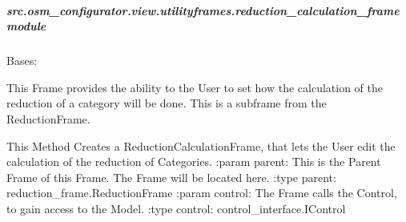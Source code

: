 \documentclass[letterpaper,10pt,english]{sphinxmanual}
\begin{document}
\subparagraph{src.osm\_configurator.view.utilityframes.reduction\_calculation\_frame module}
\label{\detokenize{apidoc/src.osm_configurator.view.utilityframes:module-src.osm_configurator.view.utilityframes.reduction_calculation_frame}}\label{\detokenize{apidoc/src.osm_configurator.view.utilityframes:src-osm-configurator-view-utilityframes-reduction-calculation-frame-module}}

\begin{fulllineitems}
\label{\detokenize{apidoc/src.osm_configurator.view.utilityframes:src.osm_configurator.view.utilityframes.reduction_calculation_frame.ReductionCalculationFrame}}
\pysigstartsignatures
{}
\pysigstopsignatures
\sphinxAtStartPar
Bases: 

\sphinxAtStartPar
This Frame provides the ability to the User to set how the calculation of the reduction of a category
will be done.
This is a subframe from the ReductionFrame.

\begin{fulllineitems}
\label{\detokenize{apidoc/src.osm_configurator.view.utilityframes:src.osm_configurator.view.utilityframes.reduction_calculation_frame.ReductionCalculationFrame.__init__}}
\pysigstartsignatures
{}
\pysigstopsignatures
\sphinxAtStartPar
This Method Creates a ReductionCalculationFrame, that lets the User edit the calculation of the reduction of
Categories.
:param parent: This is the Parent Frame of this Frame. The Frame will be located here.
:type parent: reduction\_frame.ReductionFrame
:param control: The Frame calls the Control, to gain access to the Model.
:type control: control\_interface.IControl

\end{fulllineitems}


\end{fulllineitems}
\end{document}
